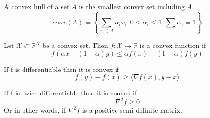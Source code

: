 \documentclass[a4paper,english,12pt]{article}
\begin{document}
\begin{defn}
A convex hull of a set $A$ is the smallest convex set including $A$.
$$ conv(A) = \left\{ \sum_{x_i \in A} \alpha _i x_i : 0 \leq \alpha _i \leq 1 , \sum \alpha _i = 1 \right\} $$
\end{defn}

\begin{defn}
Let $\mathcal{X} \subset \mathbb{R}^N$ be a convex set. Then $f: \mathcal{X}\rightarrow\mathbb{R}$ is a convex function if
$$ f\left( \alpha x + (1-\alpha)y \right) \leq \alpha f(x) + (1-\alpha) f(y) $$

If f is differentiable then it is convex if
$$ f(y) - f(x) \geq \langle \nabla f(x), {y-x} \rangle $$

If f is twice differentiable then it is convex if
$$ \nabla ^2 f \geq 0 $$
Or in other words, if $\nabla ^2 f$ is a positive semi-definite matrix.
\end{defn}
\end{document}
